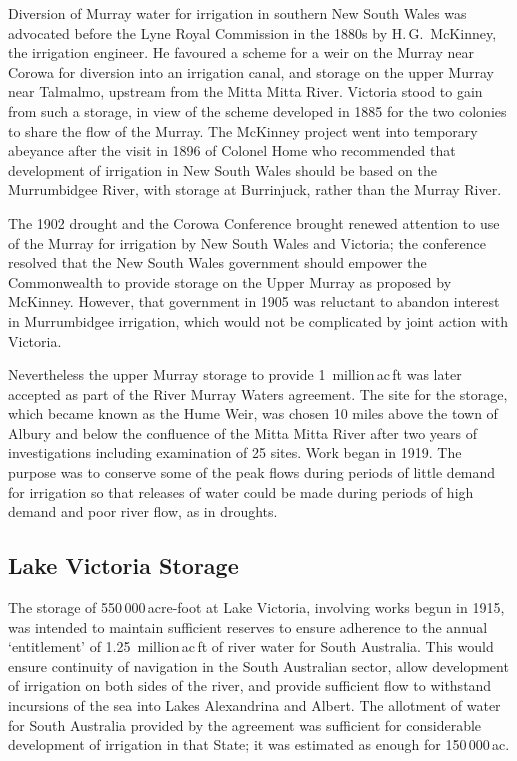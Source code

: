 Diversion of Murray water for irrigation in southern New South Wales
was advocated before the Lyne Royal Commission in the 1880s by
H.\,G.~McKinney,  the irrigation engineer.  He
favoured a scheme for a weir on the Murray  near
Corowa  for diversion into an irrigation canal, and
storage on the upper Murray near Talmalmo, 
upstream from the Mitta Mitta River. 
Victoria stood to gain from such a storage, in view of the scheme
developed in 1885 for the two colonies to share the flow of the
Murray.  The McKinney project went into temporary abeyance after the
visit in 1896 of Colonel Home who recommended that development of
irrigation in New South Wales should be based on the Murrumbidgee
River,  with storage at Burrinjuck,
 rather than the Murray
River.

The 1902 drought and the Corowa Conference brought renewed attention
to use of the Murray for irrigation by New South Wales and Victoria;
the conference resolved that the New South Wales government should
empower the Commonwealth to provide storage on the Upper Murray as
proposed by McKinney.  However, that government in 1905 was reluctant
to abandon interest in Murrumbidgee irrigation, which would not be
complicated by joint action with
Victoria.

Nevertheless the upper Murray storage to provide 1~million\,ac\,ft was
later accepted as part of the River Murray Waters agreement. The site
for the storage, which became known as the Hume Weir,
 was chosen 10 miles above the town of Albury
 and below the confluence of the Mitta Mitta River
after two years of investigations including examination of 25 sites.
Work began in 1919.  The purpose was to conserve some of the peak
flows during periods of little demand for irrigation so that releases
of water could be made during periods of high demand and poor river
flow, as in droughts.

\subsection*{Lake Victoria Storage}

The storage of 550\,000\,acre-foot at Lake Victoria, involving works
begun in 1915, was intended to maintain sufficient reserves to ensure
adherence to the annual `entitlement' of 1.25~million\,ac\,ft of river
water for South Australia.  This would ensure continuity of navigation
in the South Australian sector, allow development of irrigation on
both sides of the river, and provide sufficient flow to withstand
incursions of the sea into Lakes Alexandrina and
Albert.  The allotment of
water for South Australia provided by the agreement was sufficient for
considerable development of irrigation in that State; it was estimated
as enough for 150\,000\,ac.

